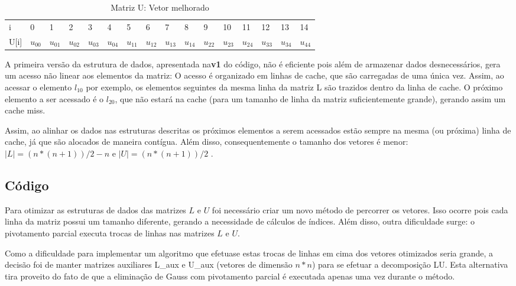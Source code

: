\documentclass[12pt]{article}
\begin{document}
\begin{table}[H]
\caption{Matriz U: Vetor melhorado}
\label{my-label}
\begin{tabular}{l|l|l|l|l|l|l|l|l|l|l|l|l|l|l|l|}
\cline{2-16}
i   & 0      & 1      & 2      & 3      & 4      & 5      & 6      & 7      & 8      & 9   & 10  & 11  & 12  & 13  & 14 \\ \cline{2-16}
U[i] & $u_{00}$ & $u_{01}$ & $u_{02}$ & $u_{03}$ & $u_{04}$ & $u_{11}$ & $u_{12}$ & $u_{13}$ & $u_{14}$ & $u_{22}$ & $u_{23}$ & $u_{24}$ & $u_{33}$ & $u_{34}$ & $u_{44}$ \\ \cline{2-16}
\end{tabular}
\end{table}

A primeira versão da estrutura de dados, apresentada na\textbf{v1} do código, não é eficiente pois além de armazenar dados desnecessários, gera um acesso não linear aos elementos da matriz: O acesso é organizado em linhas de cache, que são carregadas de uma única vez. Assim, ao acessar o elemento $l_{10}$ por exemplo, os elementos seguintes da mesma linha da matriz L são trazidos dentro da linha de cache. O próximo elemento a ser acessado é o $l_{20}$, que não estará na cache (para um tamanho de linha da matriz suficientemente grande), gerando assim um cache miss.

Assim, ao alinhar os dados nas estruturas descritas os próximos elementos a serem acessados estão sempre na mesma (ou próxima) linha de cache, já que são alocados de maneira contígua. Além disso, consequentemente o tamanho dos vetores é menor: $|L| = (n * (n+1)) / 2 - n$ e $|U| = (n * (n+1)) / 2$ .


\subsection{Código}

Para otimizar as estruturas de dados das matrizes $L$ e $U$ foi necessário criar um novo método de percorrer os vetores. Isso ocorre pois cada linha da matriz possui um tamanho diferente, gerando a necessidade de cálculos de índices. Além disso, outra dificuldade surge: o pivotamento parcial executa trocas de linhas nas matrizes $L$ e $U$.

Como a dificuldade para implementar um algoritmo que efetuase estas trocas de linhas em cima dos vetores otimizados seria grande, a decisão foi de manter matrizes auxiliares L\_aux e U\_aux (vetores de dimensão $n * n$) para se efetuar a decomposição LU. Esta alternativa tira proveito do fato de que a eliminação de Gauss com pivotamento parcial é executada apenas uma vez durante o método.
\end{document}
